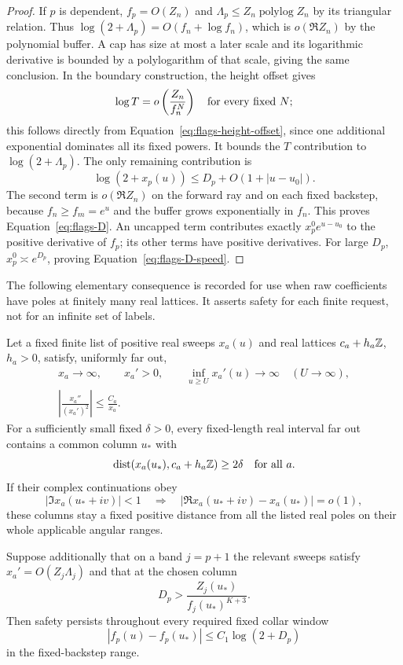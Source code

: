 \begin{proof}
If $p$ is dependent, $f_p=O(Z_n)$ and
$\Lambda_p\le Z_n\operatorname{polylog}Z_n$ by its triangular
relation. Thus $\log(2+\Lambda_p)=O(f_n+\log f_n)$, which is
$o(\Re Z_n)$ by the polynomial buffer. A cap has size at most
a later scale and its logarithmic derivative is bounded by a
polylogarithm of that scale, giving the same conclusion. In the
boundary construction, the height offset gives
\[
 \log T=o\left(\frac{Z_n}{f_n^N}\right)
 \quad\hbox{for every fixed }N;
\]
this follows directly from
Equation~\eqref{eq:flags-height-offset}, since one additional
exponential dominates all its fixed powers. It bounds the
$T$ contribution to $\log(2+\Lambda_p)$. The only remaining
contribution is
\[
 \log(2+x_p(u))\le D_p+O(1+|u-u_0|).
\]
The second term is $o(\Re Z_n)$ on the forward ray and on each
fixed backstep, because $f_n\ge f_m=e^u$ and the buffer grows
exponentially in $f_n$. This proves
Equation~\eqref{eq:flags-D}. An uncapped term contributes exactly
$x_p^0e^{u-u_0}$ to the positive derivative of $f_p$; its other
terms have positive derivatives. For large $D_p$,
$x_p^0\asymp e^{D_p}$, proving
Equation~\eqref{eq:flags-D-speed}.
\end{proof}

The following elementary consequence is recorded for use when raw
coefficients have poles at finitely many real lattices. It asserts
safety for each finite request, not for an infinite set of labels.

\begin{lemma}\label{lem:flags-safe-columns}
Let a fixed finite list of positive real sweeps $x_a(u)$ and real
lattices $c_a+h_a\mathbb{Z}$, $h_a>0$, satisfy, uniformly far out,
\begin{equation}\label{eq:flags-sweeps}
 \begin{gathered}
 x_a\to\infty,\qquad x_a'>0,\qquad
 \inf_{u\ge U}x_a'(u)\longrightarrow\infty\quad(U\to\infty),\\
 \left|\frac{x_a''}{(x_a')^2}\right|\le\frac{C_a}{x_a}.
 \end{gathered}
\end{equation}
For a sufficiently small fixed $\delta>0$, every fixed-length
real interval far out contains a common column $u_*$ with
\[
 \operatorname{dist}(x_a(u_*),c_a+h_a\mathbb{Z})\ge2\delta
 \quad\hbox{for all }a.
\]
If their complex continuations obey
\[
 |\Im x_a(u_*+iv)|<1
 \quad\Longrightarrow\quad
 |\Re x_a(u_*+iv)-x_a(u_*)|=o(1),
\]
these columns stay a fixed positive distance from all the listed
real poles on their whole applicable angular ranges.

Suppose additionally that on a band $j=p+1$ the relevant sweeps
satisfy $x_a'=O(Z_j\Lambda_j)$ and that at the chosen column
\begin{equation}\label{eq:flags-D-active}
 D_p>\frac{Z_j(u_*)}{f_j(u_*)^{K+3}}.
\end{equation}
Then safety persists throughout every required fixed collar window
\[
 |f_p(u)-f_p(u_*)|\le C_1\log(2+D_p)
\]
in the fixed-backstep range.
\end{lemma}

